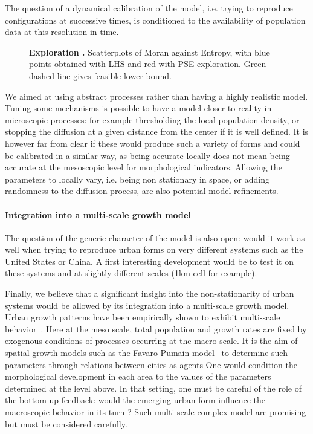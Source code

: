 \documentclass[10pt,letterpaper]{article}
\begin{document}
The question of  a dynamical calibration of the model, i.e. trying to reproduce configurations at successive times, is conditioned to the availability of population data at this resolution in time.


\begin{figure}
\caption{\textbf{Exploration .} Scatterplots of Moran against Entropy, with blue points obtained with LHS and red with  PSE  exploration. Green dashed line gives  feasible lower bound.}
\label{fig:fig7}
\end{figure}


We aimed at using abstract processes rather than having a highly realistic model. Tuning some mechanisms is possible to have a model closer to reality in microscopic processes: for example thresholding the local population density, or stopping the diffusion at a given distance from the center if it is well defined. It is however far from clear if these would produce such a variety of forms and could be calibrated in a similar way, as being accurate locally does not mean being accurate at the mesoscopic level for morphological indicators. Allowing the parameters to locally vary, i.e. being non stationary in space, or adding randomness to the diffusion process, are also potential model refinements.



\paragraph{Integration into a multi-scale growth model}

The question of the generic character of the model is also open: would it work as well when trying to reproduce urban forms on very different  systems such as the United States or China. A first interesting development would be to test it on these systems and at slightly different scales (1km cell for example).

Finally, we believe that a significant insight into the non-stationarity of urban systems would be allowed by its integration into a multi-scale growth model. Urban growth patterns have been empirically shown to exhibit  multi-scale behavior~\cite{zhang2013identifying}. Here at the meso scale, total population and growth rates are fixed by exogenous conditions of processes occurring at the macro scale. It is  the aim of spatial growth models such as the Favaro-Pumain model~\cite{favaro2011gibrat} to determine such parameters through relations between cities as agents One would condition the morphological development in each area to the values of the parameters determined at the level above. In that setting, one must be careful of the role of the bottom-up feedback: would the emerging urban form influence the macroscopic behavior in its turn ? Such multi-scale complex model are promising but must be considered carefully.
\end{document}
